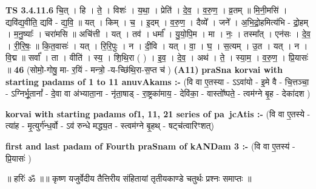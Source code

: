 \documentclass[17pt]{extarticle}
\begin{document}
                  \newline
                                \textbf{ TS 3.4.11.6} \newline
                  चि॒त् । हि । ते॒ । विशः॑ । य॒था॒ । प्रेति॑ । दे॒व॒ । व॒रु॒ण॒ । व्र॒तम् ॥ मि॒नी॒मसि॑ । द्यवि॑द्य॒वीति॒ द्यवि॑ - द्य॒वि॒ ॥ यत् । किम् । च॒ । इ॒दम् । व॒रु॒ण॒ । दैव्ये᳚ । जने᳚ । अ॒भि॒द्रो॒हमित्य॑भि - द्रो॒हम् । म॒नु॒ष्याः᳚ । चरा॑मसि ॥ अचि॑त्ती । यत् । तव॑ । धर्मा᳚ । यु॒यो॒पि॒म । मा । नः॒ । तस्मा᳚त् । एन॑सः । दे॒व॒ । री॒रि॒षः॒ ॥ कि॒त॒वासः॑ । यत् । रि॒रि॒पुः । न । दी॒वि । यत् । वा॒ । घ॒ । स॒त्यम् । उ॒त । यत् । न । वि॒द्म ॥ सर्वा᳚ । ता । वीति॑ । स्य॒ । शि॒थि॒रा ( ) । इ॒व॒ । दे॒व॒ । अथ॑ । ते॒ । स्या॒म॒ । व॒रु॒ण॒ । प्रि॒यासः॑ ॥ \textbf{  46} \newline
                  \newline
                      (सोमो॒-गोषु॒ मा- र॒यिं - मन्त्रो॒ -य-च्छि॑थि॒रा-स॒प्त च॑ )  \textbf{(A11)} \newline \newline
\textbf{praSna korvai with starting padams of 1 to 11 anuvAkams :-} \newline
(वि वा ए॒तस्या - ऽऽवा॑यो - इ॒मे वै - चि॒त्तञ्चा॒ - ऽग्निर्भू॒तानां᳚ - दे॒वा वा अ॑भ्याता॒ना - नृ॑ता॒षाड् - रा॒ष्ट्रका॑माय॒ - देवि॑का॒ - वास्तो᳚ष्पते॒ - त्वम॑ग्ने बृ॒ह - देका॑दश ) \newline

\textbf{korvai with starting padams of1, 11, 21 series of pa~jcAtis :-} \newline
(वि वा ए॒तस्ये - त्या॑ह - मृ॒त्युर्ग॑न्ध॒र्वो - ऽव॑ रुन्धे मद्ध्य॒त - स्त्वम॑ग्ने बृ॒हथ् - षट्च॑त्वारिꣳशत्) \newline

\textbf{first and last padam of Fourth praSnam of kANDam 3 :-} \newline
(वि वा ए॒तस्य॑ - प्रि॒यासः॑ ) \newline 


॥ हरिः॑ ॐ ॥॥ कृष्ण यजुर्वेदीय तैत्तिरीय संहितायां तृतीयकाण्डे चतुर्थः प्रश्नः समाप्तः ॥ \newline
\pagebreak
\pagebreak
        
\end{document}
